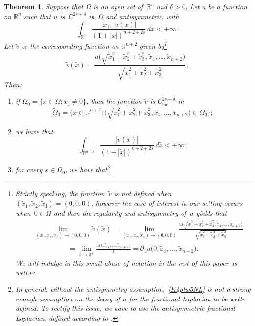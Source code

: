 \documentclass[a4paper,12pt,reqno]{amsart}
\numberwithin{equation}{section}
\newtheorem{theorem}{Theorem}[section]
\theoremstyle{definition}
\theoremstyle{notation}
\newcommand{\R}{\mathds{R}}
\begin{document}
\begin{theorem}
\label{thm:odd:flap}
Suppose that $\Omega$ is an open set of~$\R^n$ and $\delta>0$. 
%
Let $u$ be a function on $\R^n$ such that $u$ is~$C^{2s + \delta}$ in~$\Omega$ and
antisymmetric, with
\begin{equation}
\int_{\R^n}\frac{|x_1|\,|  u(x)|}{(1 + |x|)^{n + 2 +2s}} \,dx<+\infty. \label{K4ptw5NL}
\end{equation}
%
Let $\tilde{v}$ be the corresponding function on $\R^{n + 2}$ given by\footnote{Strictly speaking, the function~$\tilde v$ is not defined when~$(\tilde x_1, \tilde x_2, \tilde x_3) = (0, 0, 0)$, however the case of interest in our setting occurs when~$0\in\Omega$ and then the regularity
and antisymmetry of~$u$ yields that
\begin{eqnarray*}&& \lim_{(\tilde x_1, \tilde x_2, \tilde x_3)\to(0,0,0)}\tilde{v}(\tilde{x}) = \lim_{(\tilde x_1, \tilde x_2, \tilde x_3)\to(0,0,0)}\frac{u\big (\sqrt{\tilde{x}_1^2 + \tilde{x}_2^2 + \tilde{x}_3^2}, \tilde{x}_4, \ldots, \tilde{x}_{n + 2} \big )}{\sqrt{\tilde{x}_1^2 + \tilde{x}_2^2 + \tilde{x}_3^2}}\\&&\quad\qquad\qquad=
\lim_{t\to0^+}\frac{u\big (t, \tilde{x}_4, \ldots, \tilde{x}_{n + 2} \big )}{t}=\partial_1
u\big(0,\tilde{x}_4, \ldots, \tilde{x}_{n + 2} \big ).\end{eqnarray*}
We will indulge in this small abuse of notation in the rest of this paper as well.}
\begin{equation}\label{q0wifpojgl5tDD23rt-1}
 \tilde{v}(\tilde{x}) = \frac{u\big (\sqrt{\tilde{x}_1^2 + \tilde{x}_2^2 + \tilde{x}_3^2}, \tilde{x}_4, \ldots, \tilde{x}_{n + 2} \big )}{\sqrt{\tilde{x}_1^2 + \tilde{x}_2^2 + \tilde{x}_3^2}} \, .
\end{equation}
%
Then:
\begin{enumerate}[label={\rm (\alph*)}]
\item\label{thm:odd:flap:a} if $\Omega_0 = \{x \in \Omega : x_1 \ne 0\}$, then the function $\tilde{v}$ is $C^{2s + \delta}_{\mathrm{loc}}$ in
\[
 \tilde \Omega_0 = \bigg \{\tilde{x} \in \R^{n + 2} : \Big (\sqrt{\tilde{x}_1^2 + \tilde{x}_2^2 + \tilde{x}_3^2}, \tilde{x}_4, \ldots, \tilde{x}_{n + 2}\Big ) \in \Omega_0\bigg \} ;
\]
\item\label{thm:odd:flap:b} we have that
\begin{equation*}
\int_{\R^{n+2}}\frac{|\tilde{v}(\tilde{x})|}{
(1 + |\tilde{x}|)^{n + 2 + 2s}}\,d\tilde x<+\infty;\end{equation*}
\item\label{thm:odd:flap:c} for every $x \in \Omega_0$, we have that\footnote{In general, without the antisymmetry assumption,~\eqref{K4ptw5NL} is not a strong enough assumption on the decay of \(u\) for the fractional Laplacian to be well-defined. To rectify this issue, we have to use the antisymmetric fractional Laplacian, defined according to \cite[Definition 1.2]{dtv}.}

\end{enumerate}
\end{theorem}
\end{document}
